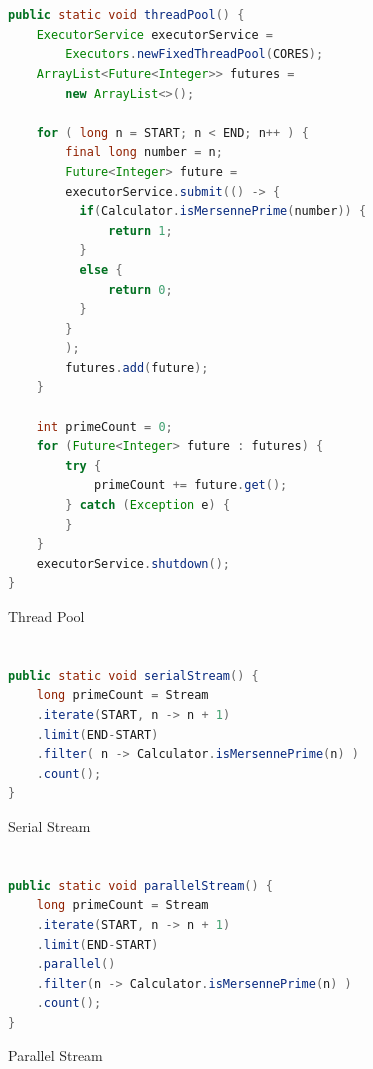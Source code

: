 \documentclass[]{report}
\begin{document}
\chapter{}
\begin{figure}[h!]
	\caption{Thread Pool}
	\begin{lstlisting}[language=Java,frame=single]
public static void threadPool() {
	ExecutorService executorService =
		Executors.newFixedThreadPool(CORES);
	ArrayList<Future<Integer>> futures =
		new ArrayList<>();
	
	for ( long n = START; n < END; n++ ) {
		final long number = n;
		Future<Integer> future =
		executorService.submit(() -> {
		  if(Calculator.isMersennePrime(number)) {
			  return 1; 
		  }
		  else {
			  return 0;
		  }
		}
		);
		futures.add(future);
	}
	
	int primeCount = 0;
	for (Future<Integer> future : futures) {
		try {
			primeCount += future.get();
		} catch (Exception e) {
		}
	}
	executorService.shutdown();
}
	\end{lstlisting}
\end{figure}

\chapter{}
\begin{figure}[h!]
	\caption{Serial Stream}
	\begin{lstlisting}[language=Java,frame=single]
public static void serialStream() {
	long primeCount = Stream
	.iterate(START, n -> n + 1)
	.limit(END-START)
	.filter( n -> Calculator.isMersennePrime(n) )
	.count();
}
	\end{lstlisting}
\end{figure}
\chapter{}
\begin{figure}[h!]
	\caption{Parallel Stream}
	\begin{lstlisting}[language=Java,frame=single]
public static void parallelStream() {
	long primeCount = Stream
	.iterate(START, n -> n + 1)
	.limit(END-START)
	.parallel()
	.filter(n -> Calculator.isMersennePrime(n) )
	.count();
}
	\end{lstlisting}
\end{figure}
\end{document}
